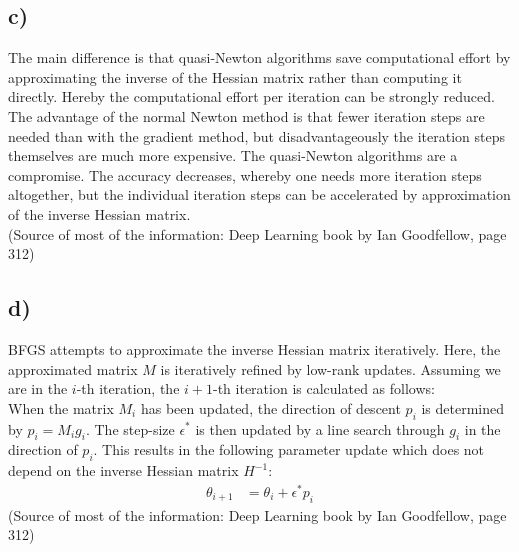 \documentclass[a4paper]{article}
\begin{document}
    
    \subsection*{c)}
        The main difference is that quasi-Newton algorithms save computational effort by approximating the inverse of the Hessian matrix rather than computing it directly.
        Hereby the computational effort per iteration can be strongly reduced.
        The advantage of the normal Newton method is that fewer iteration steps are needed than with the gradient method, but disadvantageously the iteration steps themselves are much more expensive.
        The quasi-Newton algorithms are a compromise.
        The accuracy decreases, whereby one needs more iteration steps altogether, but the individual iteration steps can be accelerated by approximation of the inverse Hessian matrix.\\
        (Source of most of the information: Deep Learning book by Ian Goodfellow, page 312)

\newpage
    \subsection*{d)}
        BFGS attempts to approximate the inverse Hessian matrix iteratively.
        Here, the approximated matrix $M$ is iteratively refined by low-rank updates.
        Assuming we are in the $i$-th iteration, the $i+1$-th iteration is calculated as follows:\\
        When the matrix $M_i$ has been updated, the direction of descent $p_i$ is determined by $p_i = M_i g_i$.
        The step-size $\epsilon^*$ is then updated by a line search through $g_i$ in the direction of $p_i$. This results in the following parameter update which does not depend on the inverse Hessian matrix $H^{-1}$:
        \begin{align}
            \theta_{i+1} &= \theta_i + \epsilon^* p_i
        \end{align}
        (Source of most of the information: Deep Learning book by Ian Goodfellow, page 312)
\end{document}
